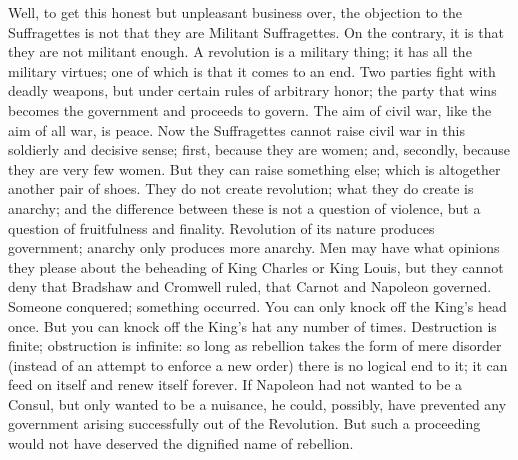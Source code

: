 \documentclass{book}
\begin{document}
Well, to get this honest but unpleasant business over, the objection to the Suffragettes is not that they are Militant Suffragettes. On the contrary, it is that they are not militant enough. A revolution is a military thing; it has all the military virtues; one of which is that it comes to an end. Two parties fight with deadly weapons, but under certain rules of arbitrary honor; the party that wins becomes the government and proceeds to govern. The aim of civil war, like the aim of all war, is peace. Now the Suffragettes cannot raise civil war in this soldierly and decisive sense; first, because they are women; and, secondly, because they are very few women. But they can raise something else; which is altogether another pair of shoes. They do not create revolution; what they do create is anarchy; and the difference between these is not a question of violence, but a question of fruitfulness and finality. Revolution of its nature produces government; anarchy only produces more anarchy. Men may have what opinions they please about the beheading of King Charles or King Louis, but they cannot deny that Bradshaw and Cromwell ruled, that Carnot and Napoleon governed. Someone conquered; something occurred. You can only knock off the King’s head once. But you can knock off the King’s hat any number of times. Destruction is finite; obstruction is infinite: so long as rebellion takes the form of mere disorder (instead of an attempt to enforce a new order) there is no logical end to it; it can feed on itself and renew itself forever. If Napoleon had not wanted to be a Consul, but only wanted to be a nuisance, he could, possibly, have prevented any government arising successfully out of the Revolution. But such a proceeding would not have deserved the dignified name of rebellion.
\end{document}
